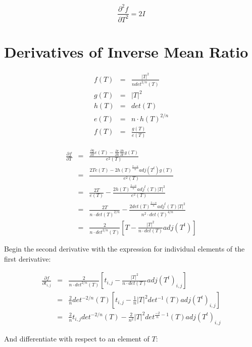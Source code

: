 \documentclass{report}
\begin{document}
\begin{equation}
\frac{\partial^2 f}{\partial T^2} = 2 I
\end{equation}


\section{Derivatives of Inverse Mean Ratio}

\begin{eqnarray}
f(T) & = & \frac{|T|^2}{n det^{2/n}(T)} \\
g(T) & = & |T|^2 \\
h(T) & = & det(T) \\
e(T) & = & n \cdot h(T)^{2/n} \\
f(T) & = & \frac{g(T)}{e(T)} 
\end{eqnarray}

\begin{eqnarray}
\frac{\partial f}{\partial T} &=& \frac{
\frac{\partial g}{\partial T} e(T) - 
\frac{\partial e}{\partial h} \frac{\partial h}{\partial t} g(T)}
{e^2(T)} \\
&=& 
\frac{2 T e(T) - 
2 h(T)^\frac{2-n}{n} adj(T^t) g(T)}
{e^2(T)} \\
& = &  
\frac{2 T}{e(T)} -
\frac{2 h(T)^{\frac{2-n}{n}} adj^t(T) |T|^2}{e^2(T)} \\
& = &  
\frac{2 T}{n \cdot det(T)^{2/n}} -
\frac{2 det(T)^{\frac{2-n}{n}} adj^t(T) |T|^2}{n^2 \cdot det(T)^{4/n}} \\
& = &  
\frac{2}{n \cdot det^{2/n}(T)}\left[ T - \frac{|T|^2}{n \cdot det(T)} adj(T^t) \right]
\end{eqnarray}

Begin the second derivative with the  expression for individual elements of the first derivative:

\begin{eqnarray}
\frac{\partial f}{\partial t_{i,j}} & = & 
\frac{2}{n \cdot det^{2/n}(T)}\left[ t_{i,j} - \frac{|T|^2}{n \cdot det(T)} adj(T^t)_{i,j} \right] \\
 & = & 
\frac{2}{n}det^{-2/n}(T)\left[ t_{i,j} - \frac{1}{n}|T|^2 det^{-1}(T) adj(T^t)_{i,j}\right] \\
 & = &
\frac{2}{n} t_{i,j} det^{-2/n}(T) - \frac{2}{n^2} |T|^2 det^{\frac{-2}{n} - 1}(T) adj(T^t)_{i,j} 
\end{eqnarray}

And differentiate with respect to an element of $T$:
\end{document}
